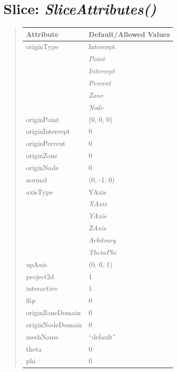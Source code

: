 \documentclass[letterpaper,10pt,english]{sphinxmanual}
\begin{document}
\section{\textbf{Slice}: \emph{SliceAttributes()}}
\label{attributes:slice-sliceattributes}
\begin{DUlineblock}{0em}
\item[] 
\end{DUlineblock}
\begin{quote}

\begin{tabulary}{\linewidth}{|L|L|}
\hline

\textbf{Attribute}
 & 
\textbf{Default/Allowed Values}
\\
\hline
originType
 & 
Intercept
\\
\hline & 
\emph{Point}
\\
\hline & 
\emph{Intercept}
\\
\hline & 
\emph{Percent}
\\
\hline & 
\emph{Zone}
\\
\hline & 
\emph{Node}
\\
\hline
originPoint
 & 
(0, 0, 0)
\\
\hline
originIntercept
 & 
0
\\
\hline
originPercent
 & 
0
\\
\hline
originZone
 & 
0
\\
\hline
originNode
 & 
0
\\
\hline
normal
 & 
(0, -1, 0)
\\
\hline
axisType
 & 
YAxis
\\
\hline & 
\emph{XAxis}
\\
\hline & 
\emph{YAxis}
\\
\hline & 
\emph{ZAxis}
\\
\hline & 
\emph{Arbitrary}
\\
\hline & 
\emph{ThetaPhi}
\\
\hline
upAxis
 & 
(0, 0, 1)
\\
\hline
project2d
 & 
1
\\
\hline
interactive
 & 
1
\\
\hline
flip
 & 
0
\\
\hline
originZoneDomain
 & 
0
\\
\hline
originNodeDomain
 & 
0
\\
\hline
meshName
 & 
``default''
\\
\hline
theta
 & 
0
\\
\hline
phi
 & 
0
\\
\hline\end{tabulary}

\end{quote}
\end{document}
